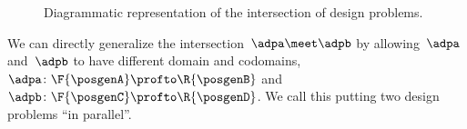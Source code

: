 \begin{figure}[h!]
    \centering
    \caption{Diagrammatic representation of the intersection of design problems. }
    \label{fig:intersectiondp}
\end{figure}

We can directly generalize the intersection~$\adpa \meet \adpb$ by allowing~$\adpa$ and~$\adpb$ to have different domain and codomains,~$\adpa \colon \F{\posgenA} \profto \R{\posgenB}$ and~$\adpb \colon \F{\posgenC} \profto \R{\posgenD}$.
We call this putting two design problems ``in parallel''.
